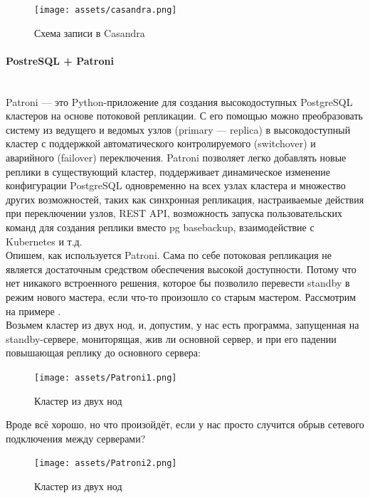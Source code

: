 \begin{figure}[h]
    \centering
    \texttt{[image: assets/casandra.png]}
    \caption{Схема записи в Casandra}
    \label{fig:mesh2}
\end{figure}

\paragraph{PostreSQL + Patroni} ~\\

Patroni — это Python-приложение для создания высокодоступных PostgreSQL кластеров на основе потоковой репликации. С его помощью можно преобразовать систему из ведущего и ведомых узлов (primary — replica) в высокодоступный кластер с поддержкой автоматического контролируемого (switchover) и аварийного (failover) переключения. Patroni позволяет легко добавлять новые реплики в существующий кластер, поддерживает динамическое изменение конфигурации PostgreSQL одновременно на всех узлах кластера и множество других возможностей, таких как синхронная репликация, настраиваемые действия при переключении узлов, REST API, возможность запуска пользовательских команд для создания реплики вместо pg basebackup, взаимодействие с Kubernetes и т.д. \autocite{Klyukin} \\

Опишем, как используется Patroni. Сама по себе потоковая репликация не является достаточным средством обеспечения высокой доступности. Потому что нет никакого встроенного решения, которое бы позволило перевести standby в режим нового мастера, если что-то произошло со старым мастером. Рассмотрим на примере \autocite{Aristov}.\\
Возьмем кластер из двух нод, и, допустим, у нас есть программа, запущенная на standby-сервере, мониторящая, жив ли основной сервер, и при его падении повышающая реплику до основного сервера:

\begin{figure}[h]
    \centering
    \texttt{[image: assets/Patroni1.png]}
    \caption{Кластер из двух нод}
    \label{fig:mesh3}
\end{figure}

Вроде всё хорошо, но что произойдёт, если у нас просто случится обрыв сетевого подключения между серверами?

\begin{figure}[h]
    \centering
    \texttt{[image: assets/Patroni2.png]}
    \caption{Кластер из двух нод}
    \label{fig:mesh4}
\end{figure}

